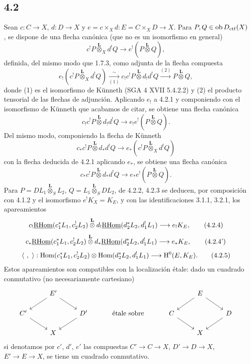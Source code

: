 \subsection*{4.2}
Sean $c:C\to X$, $d:D\to X$ y $e=c\times_Xd:E=C\times_XD\to X$. Para $P,Q\in\operatorname{ob}D_{\mathrm{ctf}}(X)$, se dispone de una flecha canónica (que no es un isomorfismo en general)
\begin{equation}
c^!P\overset{\mathbf L}{\otimes}_X d^!Q
\longrightarrow e^!(P\overset{\mathbf L}{\otimes}Q),
\tag{4.2.1}
\end{equation}
definida, del mismo modo que 1.7.3, como adjunta de la flecha compuesta
\[
e_!(c^!P\overset{\mathbf L}{\otimes}_X d^!Q)
\xrightarrow[(1)]{\sim}
 c_!c^!P\overset{\mathbf L}{\otimes}d_!d^!Q
\xrightarrow{(2)} P\overset{\mathbf L}{\otimes}Q,
\]
donde (1) es el isomorfismo de Künneth (SGA 4 XVII 5.4.2.2) y (2) el producto tensorial de las flechas de adjunción. Aplicando $e_!$ a 4.2.1 y componiendo con el isomorfismo de Künneth que acabamos de citar, se obtiene una flecha canónica
\begin{equation}
c_!c^!P\overset{\mathbf L}{\otimes}d_!d^!Q
\longrightarrow e_!e^!(P\overset{\mathbf L}{\otimes}Q).
\tag{4.2.2}
\end{equation}
Del mismo modo, componiendo la flecha de Künneth
\[
c_*c^!P\overset{\mathbf L}{\otimes}d_*d^!Q
\longrightarrow e_*(c^!P\overset{\mathbf L}{\otimes}_X d^!Q)
\]
con la flecha deducida de 4.2.1 aplicando $e_*$, se obtiene una flecha canónica
\begin{equation}
c_*c^!P\overset{\mathbf L}{\otimes}d_*d^!Q
\longrightarrow e_*e^!(P\overset{\mathbf L}{\otimes}Q).
\tag{4.2.3}
\end{equation}
Para $P=DL_1\overset{\mathbf L}{\otimes}_S L_2$, $Q=L_1\overset{\mathbf L}{\otimes}_S DL_2$, de 4.2.2, 4.2.3 se deducen, por composición con 4.1.2 y el isomorfismo $e^!K_X=K_E$, y con las identificaciones 3.1.1, 3.2.1, los apareamientos
\begin{equation}
c_!\underline{\mathrm{RHom}}(c_1^*L_1,c_2^!L_2)\overset{\mathbf L}{\otimes}
 d_!\underline{\mathrm{RHom}}(d_2^*L_2,d_1^!L_1)
\longrightarrow e_!K_E,
\tag{4.2.4}
\end{equation}
\begin{equation}
c_*\underline{\mathrm{RHom}}(c_1^*L_1,c_2^!L_2)\overset{\mathbf L}{\otimes}
 d_*\underline{\mathrm{RHom}}(d_2^*L_2,d_1^!L_1)
\longrightarrow e_*K_E,
\tag{4.2.4'}
\end{equation}
\begin{equation}
\langle\ ,\ \rangle:
\operatorname{Hom}(c_1^*L_1,c_2^!L_2)\otimes\operatorname{Hom}(d_2^*L_2,d_1^!L_1)
\longrightarrow \mathrm{H}^0(E,K_E).
\tag{4.2.5}
\end{equation}
Estos apareamientos son compatibles con la localización étale: dado un cuadrado conmutativo (no necesariamente cartesiano)
\[
\begin{tikzcd}[column sep=2.5em,row sep=1.5em]
& E' \arrow[dl] \arrow[dr] & && & E \arrow[dl] \arrow[dr] & \\
C' \arrow[dr] && D' \arrow[dl] & \text{ étale sobre } & C \arrow[dr] && D \arrow[dl] \\
& X &&&& X &
\end{tikzcd}
\]
si denotamos por $c'$, $d'$, $e'$ las compuestas $C'\to C\to X$, $D'\to D\to X$, $E'\to E\to X$, se tiene un cuadrado conmutativo.


